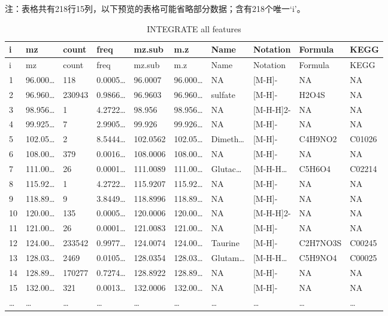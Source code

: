 \documentclass[
]{article}
\begin{document}
\begin{center}\begin{tcolorbox}[colback=gray!10, colframe=gray!50, width=0.9\linewidth, arc=1mm, boxrule=0.5pt]注：表格共有218行15列，以下预览的表格可能省略部分数据；含有218个唯一`i'。
\end{tcolorbox}
\end{center}

\begin{longtable}[]{@{}llllllllll@{}}
\caption{\label{tab:INTEGRATE-all-features}INTEGRATE all features}\tabularnewline
\toprule
i & mz & count & freq & mz.sub & m.z & Name & Notation & Formula & KEGG\tabularnewline
\midrule
\endfirsthead
\toprule
i & mz & count & freq & mz.sub & m.z & Name & Notation & Formula & KEGG\tabularnewline
\midrule
\endhead
1 & 96.000\ldots{} & 118 & 0.0005\ldots{} & 96.0007 & 96.000\ldots{} & NA & {[}M-H{]}- & NA & NA\tabularnewline
2 & 96.960\ldots{} & 230943 & 0.9866\ldots{} & 96.9603 & 96.960\ldots{} & sulfate & {[}M-H{]}- & H2O4S & NA\tabularnewline
3 & 98.956\ldots{} & 1 & 4.2722\ldots{} & 98.956 & 98.956\ldots{} & NA & {[}M-H-H{]}2- & NA & NA\tabularnewline
4 & 99.925\ldots{} & 7 & 2.9905\ldots{} & 99.926 & 99.926\ldots{} & NA & {[}M-H{]}- & NA & NA\tabularnewline
5 & 102.05\ldots{} & 2 & 8.5444\ldots{} & 102.0562 & 102.05\ldots{} & Dimeth\ldots{} & {[}M-H{]}- & C4H9NO2 & C01026\tabularnewline
6 & 108.00\ldots{} & 379 & 0.0016\ldots{} & 108.0006 & 108.00\ldots{} & NA & {[}M-H{]}- & NA & NA\tabularnewline
7 & 111.00\ldots{} & 26 & 0.0001\ldots{} & 111.0089 & 111.00\ldots{} & Glutac\ldots{} & {[}M-H-H\ldots{} & C5H6O4 & C02214\tabularnewline
8 & 115.92\ldots{} & 1 & 4.2722\ldots{} & 115.9207 & 115.92\ldots{} & NA & {[}M-H{]}- & NA & NA\tabularnewline
9 & 118.89\ldots{} & 9 & 3.8449\ldots{} & 118.8996 & 118.89\ldots{} & NA & {[}M-H{]}- & NA & NA\tabularnewline
10 & 120.00\ldots{} & 135 & 0.0005\ldots{} & 120.0006 & 120.00\ldots{} & NA & {[}M-H-H{]}2- & NA & NA\tabularnewline
11 & 121.00\ldots{} & 26 & 0.0001\ldots{} & 121.0083 & 121.00\ldots{} & NA & {[}M-H{]}- & NA & NA\tabularnewline
12 & 124.00\ldots{} & 233542 & 0.9977\ldots{} & 124.0074 & 124.00\ldots{} & Taurine & {[}M-H{]}- & C2H7NO3S & C00245\tabularnewline
13 & 128.03\ldots{} & 2469 & 0.0105\ldots{} & 128.0354 & 128.03\ldots{} & Glutam\ldots{} & {[}M-H-H\ldots{} & C5H9NO4 & C00025\tabularnewline
14 & 128.89\ldots{} & 170277 & 0.7274\ldots{} & 128.8922 & 128.89\ldots{} & NA & {[}M-H{]}- & NA & NA\tabularnewline
15 & 132.00\ldots{} & 321 & 0.0013\ldots{} & 132.0006 & 132.00\ldots{} & NA & {[}M-H{]}- & NA & NA\tabularnewline
\ldots{} & \ldots{} & \ldots{} & \ldots{} & \ldots{} & \ldots{} & \ldots{} & \ldots{} & \ldots{} & \ldots{}\tabularnewline
\bottomrule
\end{longtable}
\end{document}
